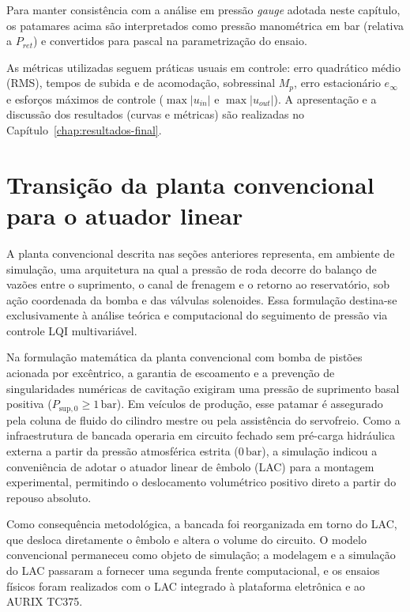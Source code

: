 Para manter consistência com a análise em pressão \emph{gauge} adotada neste capítulo, os patamares acima são interpretados como pressão manométrica em bar (relativa a $P_{ret}$) e convertidos para pascal na parametrização do ensaio.

As métricas utilizadas seguem práticas usuais em controle: erro quadrático médio (RMS), tempos de subida e de acomodação, sobressinal $M_p$, erro estacionário $e_\infty$ e esforços máximos de controle ($\max |u_{in}|$ e $\max |u_{out}|$). A apresentação e a discussão dos resultados (curvas e métricas) são realizadas no Capítulo~\ref{chap:resultados-final}.


\section[Transição da planta convencional para o atuador linear]{Transição da planta convencional para o atuador linear}
\label{sec:transicao-planta-deslocamento-linear}

A planta convencional descrita nas seções anteriores representa, em ambiente de simulação, uma arquitetura na qual a pressão de roda decorre do balanço de vazões entre o suprimento, o canal de frenagem e o retorno ao reservatório, sob ação coordenada da bomba e das válvulas solenoides. Essa formulação destina-se exclusivamente à análise teórica e computacional do seguimento de pressão via controle LQI multivariável.

Na formulação matemática da planta convencional com bomba de pistões acionada por excêntrico, a garantia de escoamento e a prevenção de singularidades numéricas de cavitação exigiram uma pressão de suprimento basal positiva ($P_{\mathrm{sup},0} \ge 1\,\text{bar}$). Em veículos de produção, esse patamar é assegurado pela coluna de fluido do cilindro mestre ou pela assistência do servofreio. Como a infraestrutura de bancada operaria em circuito fechado sem pré-carga hidráulica externa a partir da pressão atmosférica estrita ($0\,\text{bar}$), a simulação indicou a conveniência de adotar o atuador linear de êmbolo (LAC) para a montagem experimental, permitindo o deslocamento volumétrico positivo direto a partir do repouso absoluto.

Como consequência metodológica, a bancada foi reorganizada em torno do LAC, que desloca diretamente o êmbolo e altera o volume do circuito. O modelo convencional permaneceu como objeto de simulação; a modelagem e a simulação do LAC passaram a fornecer uma segunda frente computacional, e os ensaios físicos foram realizados com o LAC integrado à plataforma eletrônica e ao AURIX TC375.
 

